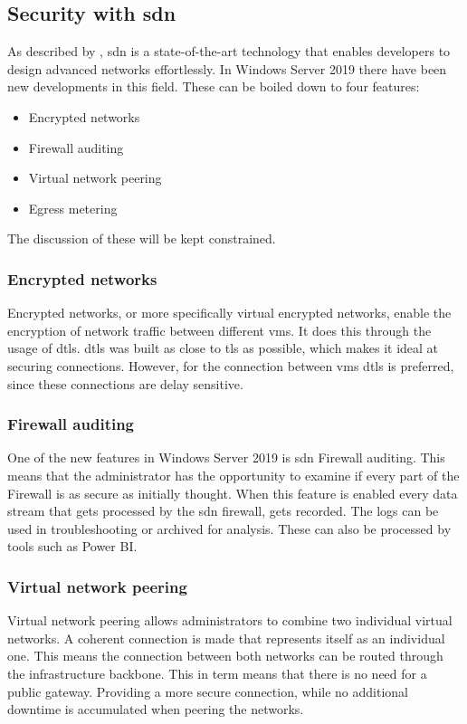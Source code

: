 \subsection{Security with \acrshort{sdn}}
\label{sdn}
As described by \textcite{Shin2016}, \acrshort{sdn} is a state-of-the-art technology that enables developers to design advanced networks effortlessly. In Windows Server 2019 there have been new developments in this field. These can be boiled down to four features: 
\begin{itemize}
	\item Encrypted networks
	\item Firewall auditing
	\item Virtual network peering
	\item Egress metering
\end{itemize} 
The discussion of these will be kept constrained.
\subsubsection{Encrypted networks}
\label{encrypted-networks}
Encrypted networks, or more specifically virtual encrypted networks, enable the encryption of network traffic between different \acrshort{vm}s. It does this through the usage of \acrfull{dtls}. \acrshort{dtls} was built as close to \acrfull{tls} as possible, which makes it ideal at securing connections. However, for the connection between \acrshort{vm}s \acrshort{dtls} is preferred, since these connections are delay sensitive.\autocite{Modadugu2004}

\subsubsection{Firewall auditing}
One of the new features in Windows Server 2019 is \acrshort{sdn} Firewall auditing. This means that the administrator has the opportunity to examine if every part of the Firewall is as secure as initially thought. When this feature is enabled every data stream that gets processed by the \acrshort{sdn} firewall, gets recorded. The logs can be used in troubleshooting or archived for analysis. These can also be processed by tools such as Power BI.

\subsubsection{Virtual network peering}
Virtual network peering allows administrators to combine two individual virtual networks. A coherent connection is made that represents itself as an individual one. This means the connection between both networks can be routed through the infrastructure backbone. This in term means that there is no need for a public gateway. Providing a more secure connection, while no additional downtime is accumulated when peering the networks.

